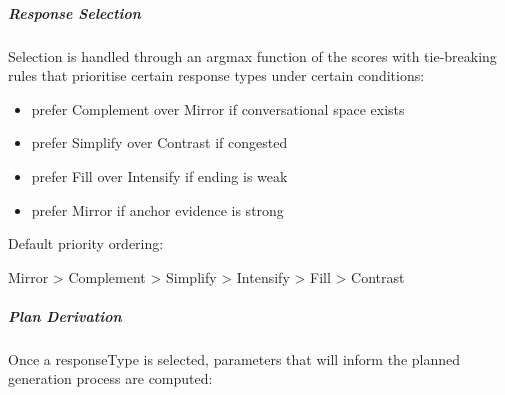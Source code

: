 \subparagraph{Response Selection}\label{response-selection}

Selection is handled through an argmax function of the scores with
tie-breaking rules that prioritise certain response types under certain
conditions:

\begin{itemize}
\item
  prefer Complement over Mirror if conversational space exists
\item
  prefer Simplify over Contrast if congested
\item
  prefer Fill over Intensify if ending is weak
\item
  prefer Mirror if anchor evidence is strong
\end{itemize}

Default priority ordering:

Mirror \textgreater{} Complement \textgreater{} Simplify \textgreater{}
Intensify \textgreater{} Fill \textgreater{} Contrast

\subparagraph{Plan Derivation}\label{plan-derivation}

Once a responseType is selected, parameters that will inform the planned
generation process are computed:

